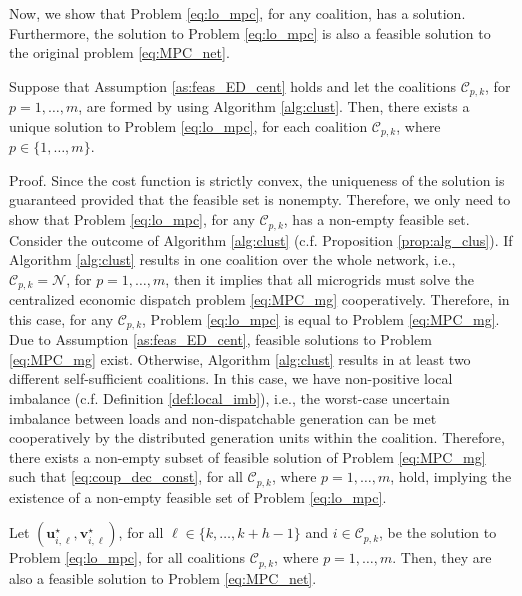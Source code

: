 Now, we show that Problem \eqref{eq:lo_mpc}, for any coalition, has a solution. Furthermore, the solution to Problem \eqref{eq:lo_mpc} is also a feasible solution to the original problem \eqref{eq:MPC_net}.
\begin{prop}
	Suppose that Assumption \ref{as:feas_ED_cent} holds and let the coalitions $\mathcal{C}_{p,k}$, for $p=1,\dots,m$, are formed by using Algorithm \ref{alg:clust}. Then,  there exists a unique solution to Problem \eqref{eq:lo_mpc}, for each coalition $\mathcal{C}_{p,k}$, where \ $p \in \{1,\dots,m\}$.
\end{prop}

\begin{pf*}{Proof.}
Since the cost function is strictly convex, the uniqueness of the solution is guaranteed provided that the feasible set is nonempty. Therefore, we only need to show that Problem \eqref{eq:lo_mpc}, for any $\mathcal{C}_{p,k}$, has a  non-empty feasible set. Consider the outcome of Algorithm \ref{alg:clust} (c.f. Proposition \ref{prop:alg_clus}). If Algorithm \ref{alg:clust} results in one coalition over the whole network, i.e., $\mathcal{C}_{p,k}=\mathcal{N}$, for $p=1,\dots,m$, then it implies that all microgrids must solve the centralized economic dispatch problem \eqref{eq:MPC_mg} cooperatively. Therefore, in this case, for any $\mathcal{C}_{p,k}$, Problem \eqref{eq:lo_mpc} is equal to Problem \eqref{eq:MPC_mg}. Due to Assumption \ref{as:feas_ED_cent}, feasible solutions to Problem \eqref{eq:MPC_mg} exist. Otherwise, Algorithm \ref{alg:clust} results in at least two different self-sufficient coalitions. In this case, we have non-positive local imbalance (c.f. Definition \ref{def:local_imb}), i.e., the worst-case uncertain imbalance between loads and non-dispatchable generation can be met cooperatively by the distributed generation units within the coalition.  Therefore, there exists a non-empty subset of feasible solution of Problem \eqref{eq:MPC_mg} such that \eqref{eq:coup_dec_const}, for all $\mathcal{C}_{p,k}$, where $p=1,\dots,m$, hold, implying the existence of a non-empty feasible set of Problem \eqref{eq:lo_mpc}. \eod
\end{pf*}
\begin{prop}
	\label{prop:feas_of_orig}
	Let $(\bm{u}_{i,\ell}^{\star},\bm{v}_{i,\ell}^{\star})$, for all $\ell \in\{k,\dots, k+h-1 \}$ and $i\in\mathcal{C}_{p,k}$, be the solution to Problem \eqref{eq:lo_mpc}, for all coalitions  $\mathcal{C}_{p,k}$, where $p=1,\dots,m$. Then, they are also a feasible solution to Problem \eqref{eq:MPC_net}. %
\end{prop}


